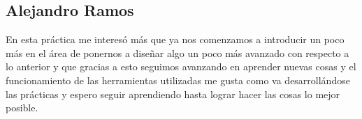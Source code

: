 \documentclass{article}
\begin{document}
\subsection{Alejandro Ramos}
En esta práctica me interesó más que ya nos comenzamos a introducir un poco más en el área de ponernos a diseñar algo un poco más avanzado con respecto a lo anterior y que gracias a esto seguimos avanzando en aprender nuevas cosas y el funcionamiento de las herramientas utilizadas me gusta como va desarrollándose las prácticas y espero seguir aprendiendo hasta lograr hacer las cosas lo mejor posible.


\end{document}
